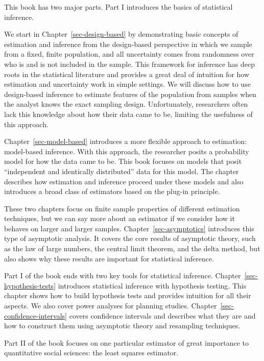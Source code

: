 \documentclass[
  13pt,
  letterpaper,
  DIV=11,
  numbers=noendperiod]{scrreprt}
\theoremstyle{plain}
\theoremstyle{plain}
\theoremstyle{definition}
\theoremstyle{definition}
\theoremstyle{remark}
\begin{document}
This book has two major parts. Part I introduces the basics of
statistical inference.

We start in Chapter~\ref{sec-design-based} by demonstrating basic
concepts of estimation and inference from the design-based perspective
in which we sample from a fixed, finite population, and all uncertainty
comes from randomness over who is and is not included in the sample.
This framework for inference has deep roots in the statistical
literature and provides a great deal of intuition for how estimation and
uncertainty work in simple settings. We will discuss how to use
design-based inference to estimate features of the population from
samples when the analyst knows the exact sampling design. Unfortunately,
researchers often lack this knowledge about how their data came to be,
limiting the usefulness of this approach.

Chapter~\ref{sec-model-based} introduces a more flexible approach to
estimation: model-based inference. With this approach, the researcher
posits a probability model for how the data came to be. This book
focuses on models that posit ``independent and identically distributed''
data for this model. The chapter describes how estimation and inference
proceed under these models and also introduces a broad class of
estimators based on the plug-in principle.

These two chapters focus on finite sample properties of different
estimation techniques, but we can say more about an estimator if we
consider how it behaves on larger and larger samples.
Chapter~\ref{sec-asymptotics} introduces this type of asymptotic
analysis. It covers the core results of asymptotic theory, such as the
law of large numbers, the central limit theorem, and the delta method,
but also shows why these results are important for statistical
inference.

Part I of the book ends with two key tools for statistical inference.
Chapter~\ref{sec-hypothesis-tests} introduces statistical inference with
hypothesis testing. This chapter shows how to build hypothesis tests and
provides intuition for all their aspects. We also cover power analyses
for planning studies. Chapter~\ref{sec-confidence-intervals} covers
confidence intervals and describes what they are and how to construct
them using asymptotic theory and resampling techniques.

Part II of the book focuses on one particular estimator of great
importance to quantitative social sciences: the least squares estimator.
\end{document}
